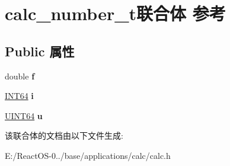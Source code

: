 \hypertarget{unioncalc__number__t}{}\section{calc\+\_\+number\+\_\+t联合体 参考}
\label{unioncalc__number__t}
\subsection*{Public 属性}
\begin{DoxyCompactItemize}
\item 
\mbox{\label{unioncalc__number__t_a6e0b42e750f8768375a89dcda3a4e20f}} 
double {\bfseries f}
\item 
\mbox{\label{unioncalc__number__t_a53e09fcc655ff09bc4af56c1570b8e8f}} 
\hyperlink{_processor_bind_8h_af16992cf571ce4103a92355761cc471e}{I\+N\+T64} {\bfseries i}
\item 
\mbox{\label{unioncalc__number__t_a516e0fc8fb4c4e1d7e1867ccb4d67e90}} 
\hyperlink{_processor_bind_8h_a57be03562867144161c1bfee95ca8f7c}{U\+I\+N\+T64} {\bfseries u}
\end{DoxyCompactItemize}


该联合体的文档由以下文件生成\+:\begin{DoxyCompactItemize}
\item 
E\+:/\+React\+O\+S-\/0../base/applications/calc/calc.\+h\end{DoxyCompactItemize}
